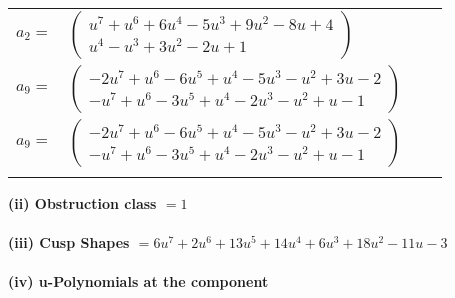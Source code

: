 \documentclass[1p]{elsarticle_modified}
\theoremstyle{definition}
\begin{document}
\begin{tabular}{m{7pt} m{180pt} m{7pt} m{180pt} }
\flushright $a_{2}=$&$\begin{pmatrix}u^7+u^6+6 u^4-5 u^3+9 u^2-8 u+4\\u^4- u^3+3 u^2-2 u+1\end{pmatrix}$ \\
\flushright $a_{9}=$&$\begin{pmatrix}-2 u^7+u^6-6 u^5+u^4-5 u^3- u^2+3 u-2\\- u^7+u^6-3 u^5+u^4-2 u^3- u^2+u-1\end{pmatrix}$\\ \flushright $a_{9}=$&$\begin{pmatrix}-2 u^7+u^6-6 u^5+u^4-5 u^3- u^2+3 u-2\\- u^7+u^6-3 u^5+u^4-2 u^3- u^2+u-1\end{pmatrix}$\\&\end{tabular}
\flushleft \textbf{(ii) Obstruction class $= 1$}\\~\\
\flushleft \textbf{(iii) Cusp Shapes $= 6 u^7+2 u^6+13 u^5+14 u^4+6 u^3+18 u^2-11 u-3$}\\~\\
\newpage\renewcommand{\arraystretch}{1}
\flushleft \textbf{(iv) u-Polynomials at the component}\newline \\
\end{document}
